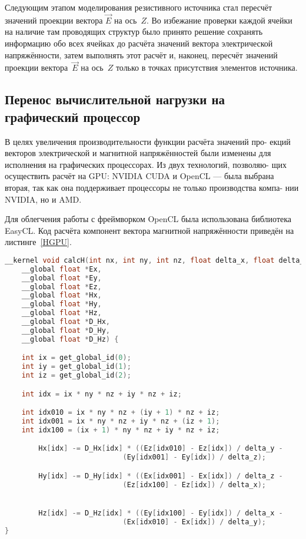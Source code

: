 Следующим этапом моделирования резистивного источника стал пересчёт
значений проекции вектора $ \vec{E} $ на ось~$ Z $. Во избежание проверки каждой ячейки на наличие там проводящих структур было принято решение сохранять информацию обо всех ячейках до расчёта значений вектора электрической напряжённости, затем выполнять этот расчёт и, наконец, пересчёт значений проекции
вектора~$ \vec{E} $ на ось~$ Z $ только в точках присутствия элементов источника.

\subsection{Перенос вычислительной нагрузки на графический процессор}

В целях увеличения производительности функции расчёта значений про-
екций векторов электрической и магнитной напряжённостей были изменены
для исполнения на графических процессорах. Из двух технологий, позволяю-
щих осуществить расчёт на GPU: NVIDIA CUDA и OpenCL --- была выбрана
вторая, так как она поддерживает процессоры не только производства компа-
нии NVIDIA, но и AMD.

Для облегчения работы с фреймворком OpenCL была использована библиотека EasyCL. Код расчёта компонент вектора магнитной напряжённости
приведён на листинге~\ref{HGPU}.

\begin{lstlisting}[caption={Код расчёта компоненты вектора магнитной напряжённости на ГПУ},label={lst:HGPU},language=C++, float, floatplacement=p]
__kernel void calcH(int nx, int ny, int nz, float delta_x, float delta_y, float delta_z,
    __global float *Ex,
    __global float *Ey,
    __global float *Ez,
    __global float *Hx,
    __global float *Hy,
    __global float *Hz,
    __global float *D_Hx,
    __global float *D_Hy,
    __global float *D_Hz) {

    int ix = get_global_id(0);
    int iy = get_global_id(1);
    int iz = get_global_id(2);

    int idx = ix * ny * nz + iy * nz + iz;

    int idx010 = ix * ny * nz + (iy + 1) * nz + iz;
    int idx001 = ix * ny * nz + iy * nz + (iz + 1);
    int idx100 = (ix + 1) * ny * nz + iy * nz + iz;

        Hx[idx] -= D_Hx[idx] * ((Ez[idx010] - Ez[idx]) / delta_y -
                            (Ey[idx001] - Ey[idx]) / delta_z);

        Hy[idx] -= D_Hy[idx] * ((Ex[idx001] - Ex[idx]) / delta_z -
                            (Ez[idx100] - Ez[idx]) / delta_x);


        Hz[idx] -= D_Hz[idx] * ((Ey[idx100] - Ey[idx]) / delta_x -
                            (Ex[idx010] - Ex[idx]) / delta_y);
}
\end{lstlisting}
\clearpage
